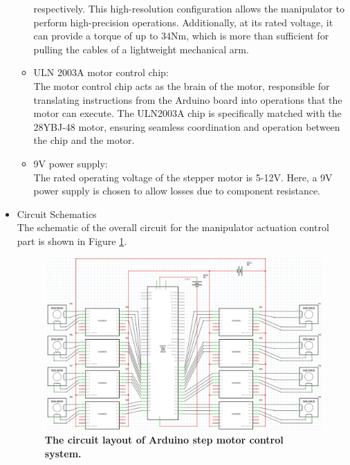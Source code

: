 \begin{itemize}
\begin{itemize}
        respectively. This high-resolution configuration allows the manipulator to perform high-precision 
        operations. Additionally, at its rated voltage, it can provide a torque of up to 34Nm, which is more than 
        sufficient for pulling the cables of a lightweight mechanical arm.
        \item ULN 2003A motor control chip: \\
        The motor control chip acts as the brain of the motor, responsible for translating instructions from the 
        Arduino board into operations that the motor can execute. The ULN2003A chip is specifically matched with 
        the 28YBJ-48 motor, ensuring seamless coordination and operation between the chip and the motor. 
        \item 9V power supply: \\
        The rated operating voltage of the stepper motor is 5-12V. Here, a 9V power supply is chosen to allow 
        losses due to component resistance. 
    \end{itemize}
    \item Circuit Schematics \\
    The schematic of the overall circuit for the manipulator actuation control part is shown in Figure \ref{fig:motor_circuit_layout}.
    \begin{figure}[H] %
        \centering %
        \captionsetup{labelsep=colon}
        \includegraphics[width=1.0\textwidth]{Image/Design/arduino_circuit_layout.png} 
        \caption[The circuit layout of Arduino step motor control system]
        {\centering \textbf{The circuit layout of Arduino step motor control system.}}
        \label{fig:motor_circuit_layout}

\end{figure}
\end{itemize}
